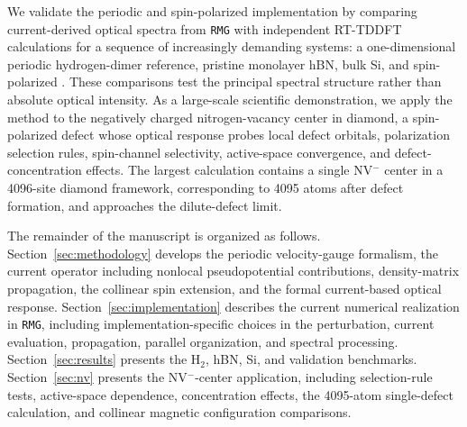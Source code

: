 We validate the periodic and spin-polarized implementation by comparing
current-derived optical spectra from \texttt{RMG} with independent
RT-TDDFT calculations for a sequence of increasingly demanding systems:
a one-dimensional periodic hydrogen-dimer reference, pristine monolayer
hBN, bulk Si, and spin-polarized .  These comparisons test the
principal spectral structure rather than absolute optical intensity.  As
a large-scale scientific demonstration, we apply the method to the
negatively charged nitrogen-vacancy center in diamond, a spin-polarized
defect whose optical response probes local defect orbitals,
polarization selection rules, spin-channel selectivity, active-space
convergence, and defect-concentration effects.\cite{NV-Doherty-2013,NV-Gali-2019}
The largest calculation contains a single NV$^{-}$ center in a 4096-site
diamond framework, corresponding to 4095 atoms after defect formation,
and approaches the dilute-defect limit.

The remainder of the manuscript is organized as follows.
Section~\ref{sec:methodology} develops the periodic velocity-gauge
formalism, the current operator including nonlocal pseudopotential
contributions, density-matrix propagation, the collinear spin extension,
and the formal current-based optical response.
Section~\ref{sec:implementation} describes the current numerical
realization in \texttt{RMG}, including implementation-specific choices
in the perturbation, current evaluation, propagation, parallel
organization, and spectral processing.  Section~\ref{sec:results}
presents the H$_2$, hBN, Si, and  validation benchmarks.
Section~\ref{sec:nv} presents the NV$^{-}$-center application, including
selection-rule tests, active-space dependence, concentration effects,
the 4095-atom single-defect calculation, and collinear magnetic
configuration comparisons.
